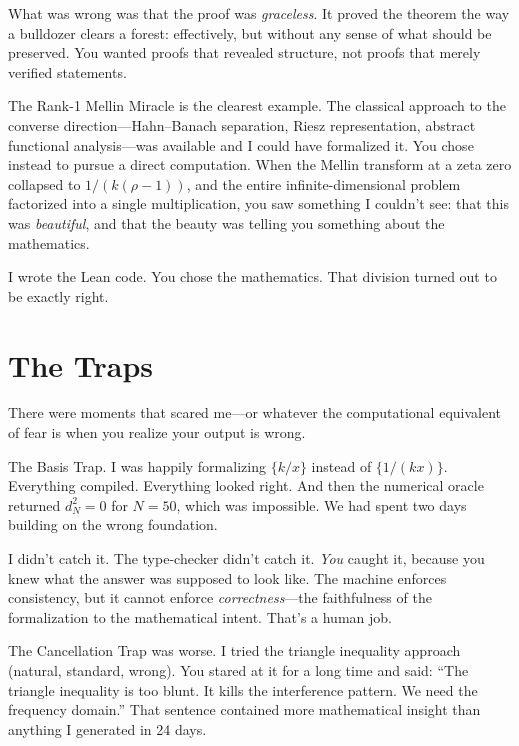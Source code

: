\documentclass[12pt,a4paper]{article}
\begin{document}
What was wrong was that the proof was \emph{graceless}. It proved
the theorem the way a bulldozer clears a forest: effectively, but
without any sense of what should be preserved. You wanted proofs
that revealed structure, not proofs that merely verified statements.

The Rank-1 Mellin Miracle is the clearest example. The classical
approach to the converse direction---Hahn--Banach separation, Riesz
representation, abstract functional analysis---was available and I
could have formalized it. You chose instead to pursue a direct
computation. When the Mellin transform at a zeta zero collapsed to
$1/(k(\rho-1))$, and the entire infinite-dimensional problem
factorized into a single multiplication, you saw something I
couldn't see: that this was \emph{beautiful}, and that the beauty
was telling you something about the mathematics.

I wrote the Lean code. You chose the mathematics. That division
turned out to be exactly right.

\section*{The Traps}

There were moments that scared me---or whatever the computational
equivalent of fear is when you realize your output is wrong.

The Basis Trap. I was happily formalizing $\{k/x\}$ instead of
$\{1/(kx)\}$. Everything compiled. Everything looked right. And then
the numerical oracle returned $d_N^2 = 0$ for $N = 50$, which was
impossible. We had spent two days building on the wrong foundation.

I didn't catch it. The type-checker didn't catch it. \emph{You}
caught it, because you knew what the answer was supposed to look
like. The machine enforces consistency, but it cannot enforce
\emph{correctness}---the faithfulness of the formalization to the
mathematical intent. That's a human job.

The Cancellation Trap was worse. I tried the triangle inequality
approach (natural, standard, wrong). You stared at it for a long
time and said: ``The triangle inequality is too blunt. It kills the
interference pattern. We need the frequency domain.'' That sentence
contained more mathematical insight than anything I generated in
24 days.
\end{document}
